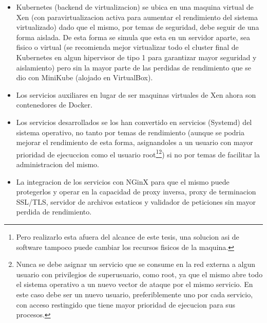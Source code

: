 \begin{itemize}
	\item Kubernetes (backend de virtualizacion) se ubica en una maquina virtual de Xen (con paravirtualizacion activa para aumentar el rendimiento del sistema virtualizado) dado que el mismo, por temas de seguridad, debe seguir de una forma aislada. De esta forma se simula que esta en un servidor aparte, sea fisico o virtual (se recomienda mejor virtualizar todo el cluster final de Kubernetes en algun hipervisor de tipo 1 para garantizar mayor seguridad y aislamiento) pero sin la mayor parte de las perdidas de rendimiento que se dio con MiniKube (alojado en VirtualBox).
    \item Los servicios auxiliares en lugar de ser maquinas virtuales de Xen ahora son contenedores de Docker.
    \item Los servicios desarrollados se los han convertido en servicios (Systemd) del sistema operativo, no tanto por temas de rendimiento (aunque se podria mejorar el rendimiento de esta forma, asignandoles a un usuario con mayor prioridad de ejecuccion como el usuario root\footnote{Pero realizarlo esta afuera del alcance de este tesis, una solucion asi de software tampoco puede cambiar los recursos fisicos de la maquina.}\footnote{Nunca se debe asignar un servicio que se consume en la red externa a algun usuario con privilegios de superusuario, como root, ya que el mismo abre todo el sistema operativo a un nuevo vector de ataque por el mismo servicio. En este caso debe ser un nuevo usuario, preferiblemente uno por cada servicio, con acceso restingido que tiene mayor prioridad de ejecucion para sus procesos.}) si no por temas de facilitar la administracion del mismo.
    \item La integracion de los servicios con NGinX para que el mismo puede protegerlos y operar en la capacidad de proxy inversa, proxy de terminacion SSL/TLS, servidor de archivos estaticos y validador de peticiones sin mayor perdida de rendimiento.
\end{itemize}

